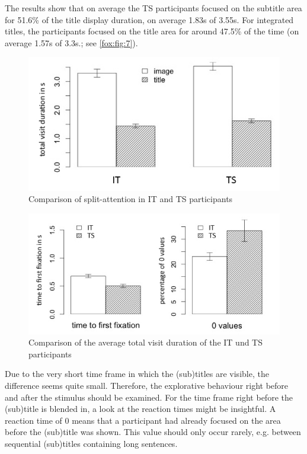 \documentclass[output=paper]{langsci/langscibook}
\begin{document}
The results show that on average the TS participants focused on the subtitle area for 51.6\% of the title display duration, on average 1.83s of 3.55s. For integrated titles, the participants focused on the title area for around 47.5\% of the time (on average 1.57s of 3.3s.; see \autoref{fox:fig:7}).


\begin{figure} 
  \includegraphics[height=.3\textheight]{figures/Fox7.png}
  \caption{Comparison of split-attention in IT and TS participants}
  \label{fox:fig:7}
\end{figure}

\begin{figure} 
  \includegraphics[height=.3\textheight]{figures/Fox8.png}
  \caption{Comparison of the average total visit duration of the IT und TS participants}
  \label{fox:fig:8}
\end{figure}


Due to the very short time frame in which the (sub)titles are visible, the difference seems quite small. Therefore, the explorative behaviour right before and after the stimulus should be examined. For the time frame right before the (sub)title is blended in, a look at the reaction times might be insightful. A reaction time of 0 means that a participant had already focused on the area before the (sub)title was shown. This value should only occur rarely, e.g. between sequential (sub)titles containing long sentences.
\end{document}
